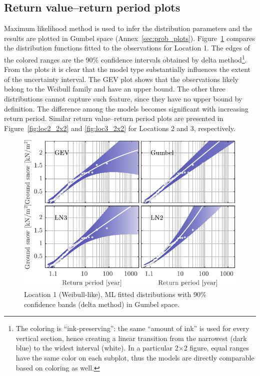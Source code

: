 \subsection{Return value--return period plots}

Maximum likelihood method is used to infer the distribution parameters and the results are plotted in Gumbel space (Annex~\ref{sec:prob_plots}). Figure~\ref{fig:loc1_2x2} compares the distribution functions fitted to the observations for Location 1. The edges of the colored ranges are the 90\% confidence intervals obtained by delta method\footnote{The coloring is ``ink-preserving'': the same ``amount of ink'' is used for every vertical section, hence creating a linear transition from the narrowest (dark blue) to the widest interval (white). In a particular 2$\times$2 figure, equal ranges have the same color on each subplot, thus the models are directly comparable based on coloring as well.}. From the plots it is clear that the model type substantially influences the extent of the uncertainty interval. The GEV plot shows that the observations likely belong to the Weibull family and have an upper bound. The other three distributions cannot capture such feature, since they have no upper bound by definition. The difference among the models becomes significant with increasing return period. Similar return value--return period plots are presented in Figure~\ref{fig:loc2_2x2} and \ref{fig:loc3_2x2} for Locations 2 and 3, respectively.

\begin{figure}[htbp!]
	\centering    
	\includegraphics[]{filled_RP_RV_2x2_ID300_CI09.pdf}
	\caption{Location 1 (Weibull-like), ML fitted distributions with 90\% confidence bands (delta method) in Gumbel space.}
	\label{fig:loc1_2x2}
\end{figure}

